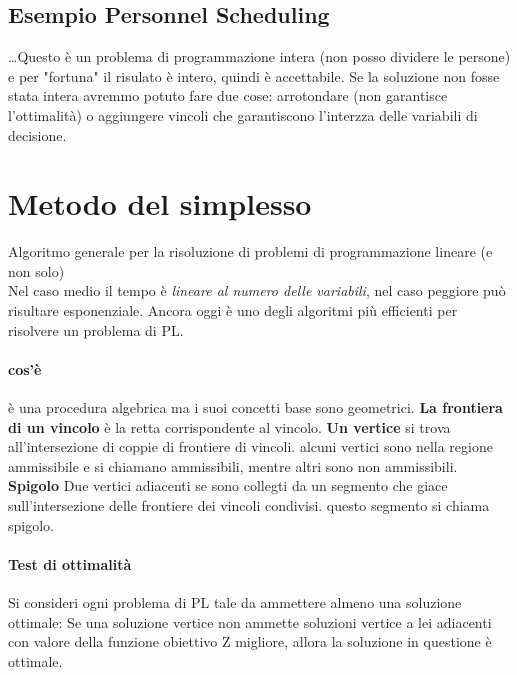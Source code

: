 \documentclass[12pt, a4paper, openany]{book}
\begin{document}
\subsection*{Esempio Personnel Scheduling}
\dots Questo è un problema di programmazione intera (non posso dividere le persone) e per "fortuna" il risulato è intero, quindi è accettabile.
Se la soluzione non fosse stata intera avremmo potuto fare due cose: arrotondare (non garantisce l'ottimalità) o aggiungere vincoli che garantiscono l'interzza delle variabili di decisione.

\section*{Metodo del simplesso}
Algoritmo generale per la risoluzione di problemi di programmazione lineare (e non solo)
\\Nel caso medio il tempo è \emph{lineare al numero delle variabili}, nel caso peggiore può risultare esponenziale.
Ancora oggi è uno degli algoritmi più efficienti per risolvere un problema di PL.

\paragraph*{cos'è} è una procedura algebrica ma i suoi concetti base sono geometrici.
\textbf{La frontiera di un vincolo} è la retta corrispondente al vincolo.
\textbf{Un vertice} si trova all'intersezione di coppie di frontiere di vincoli.
alcuni vertici sono nella regione ammissibile e si chiamano ammissibili, mentre altri sono non ammissibili.
\textbf{Spigolo} Due vertici adiacenti se sono collegti da un segmento che giace sull'intersezione delle frontiere dei vincoli condivisi.
questo segmento si chiama spigolo.
\paragraph*{Test di ottimalità} Si consideri ogni problema di PL tale da ammettere almeno una soluzione ottimale:
Se una soluzione vertice non ammette soluzioni vertice a lei adiacenti con valore della funzione obiettivo Z migliore, allora la soluzione in questione è ottimale.
\end{document}
